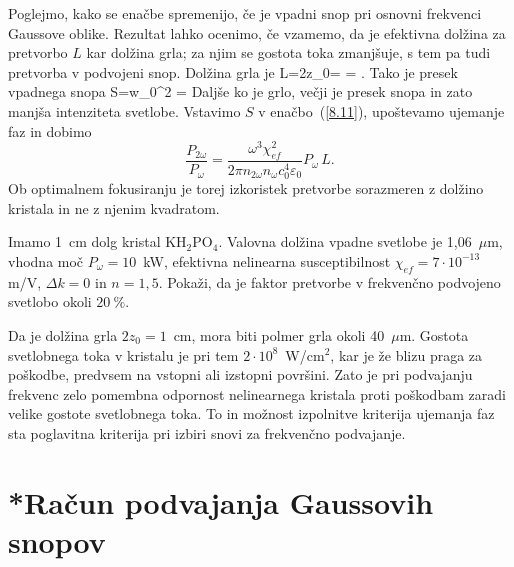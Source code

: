 Poglejmo, kako se enačbe spremenijo, če je vpadni snop pri osnovni 
frekvenci Gaussove oblike. Rezultat lahko ocenimo, če vzamemo, da je
efektivna dolžina za pretvorbo $L$ kar dolžina grla; za njim se
gostota toka zmanjšuje, s tem pa tudi pretvorba v podvojeni snop.
Dolžina grla je 
\beq
L=2z_{0}= = .
\label{SHGG}
\eeq
Tako je presek vpadnega snopa
\beq
S=\pi w_{0}^{2} = 
\eeq
Daljše ko je grlo, večji je presek snopa in zato manjša intenziteta svetlobe. 
Vstavimo $S$ v enačbo~(\ref{8.11}), upoštevamo ujemanje faz in dobimo 
\begin{equation}
\frac{P_{2\omega}}{P_{\omega}}=
\frac{\omega^3 \chi_{ef}^2}{2 \pi n_{2\omega} n_\omega c_0^4\varepsilon_0} P_\omega\, L.
\label{8.17}
\end{equation}
Ob optimalnem fokusiranju je torej izkoristek pretvorbe sorazmeren z 
dolžino kristala in ne z njenim kvadratom.

\begin{definition}
Imamo 1~cm dolg kristal KH$_{2}$PO$_{4}$. Valovna dolžina vpadne svetlobe 
je 1,06~$\mu$m, vhodna moč $P_\omega = 10$~kW, efektivna nelinearna susceptibilnost
$\chi_{ef}=7\cdot10^{-13}~$m/V, $\Delta k=0$ in $n=1,5$. Pokaži, da je
faktor pretvorbe v frekvenčno podvojeno svetlobo okoli $20~\%$.

Da je dolžina grla $2z_{0}=1$~cm, mora biti polmer
grla okoli 40~$\mu$m. Gostota svetlobnega toka v kristalu je pri
tem $2\cdot10^{8}$~W/cm$^{2}$, kar je že blizu praga za poškodbe,
predvsem na vstopni ali izstopni površini. Zato je pri podvajanju frekvenc
zelo pomembna odpornost nelinearnega kristala proti poškodbam
zaradi velike gostote svetlobnega toka. To in možnost izpolnitve kriterija ujemanja 
faz sta poglavitna kriterija pri izbiri snovi za frekvenčno podvajanje. 
\end{definition}

\section{{*}Račun podvajanja Gaussovih snopov}

